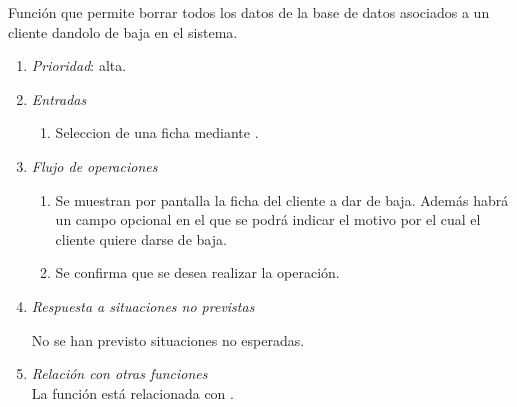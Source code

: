 

 \label{fun:bajacliente}
	Función que permite borrar todos los datos de la base de datos asociados a un cliente dandolo de baja en el sistema.
	
\begin{enumerate}
	\item \textit{Prioridad}: alta.
	\item \textit{Entradas}
	\begin{enumerate}
		\item Seleccion de una ficha mediante .
	\end{enumerate}
	\item \textit{Flujo de operaciones}
	\begin{enumerate}
		\item Se muestran por pantalla la ficha del cliente a dar de baja. Además habrá un campo opcional en el que se podrá indicar el motivo por el cual el cliente quiere darse de baja.
		\item Se confirma que se desea realizar la operación.
	\end{enumerate}
	\item \textit{Respuesta a situaciones no previstas}
	\begin{enumerate}
		No se han previsto situaciones no esperadas.
	\end{enumerate}
	\item \textit{Relación con otras funciones}\\
		La función está relacionada con .

\end{enumerate}
